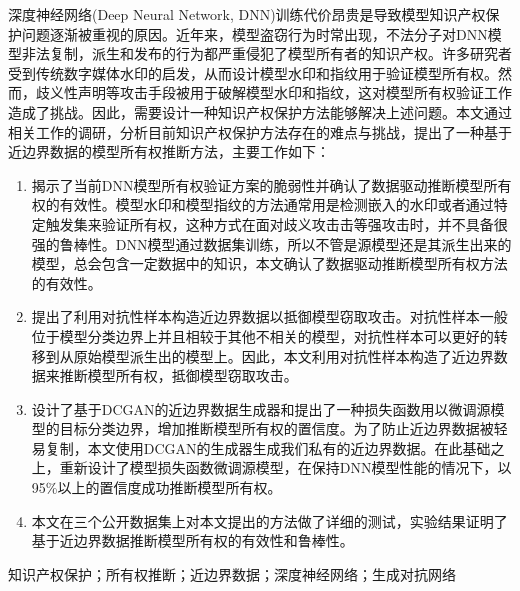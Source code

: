 

\begin{zhaiyao}

深度神经网络(Deep Neural Network, DNN)训练代价昂贵是导致模型知识产权保护问题逐渐被重视的原因。近年来，模型盗窃行为时常出现，不法分子对DNN模型非法复制，派生和发布的行为都严重侵犯了模型所有者的知识产权。许多研究者受到传统数字媒体水印的启发，从而设计模型水印和指纹用于验证模型所有权。然而，歧义性声明等攻击手段被用于破解模型水印和指纹，这对模型所有权验证工作造成了挑战。因此，需要设计一种知识产权保护方法能够解决上述问题。本文通过相关工作的调研，分析目前知识产权保护方法存在的难点与挑战，提出了一种基于近边界数据的模型所有权推断方法，主要工作如下：

\begin{enumerate}
	\renewcommand{\labelenumi}{\theenumi)}
	\item 揭示了当前DNN模型所有权验证方案的脆弱性并确认了数据驱动推断模型所有权的有效性。模型水印和模型指纹的方法通常用是检测嵌入的水印或者通过特定触发集来验证所有权，这种方式在面对歧义攻击击等强攻击时，并不具备很强的鲁棒性。DNN模型通过数据集训练，所以不管是源模型还是其派生出来的模型，总会包含一定数据中的知识，本文确认了数据驱动推断模型所有权方法的有效性。
	\item 提出了利用对抗性样本构造近边界数据以抵御模型窃取攻击。对抗性样本一般位于模型分类边界上并且相较于其他不相关的模型，对抗性样本可以更好的转移到从原始模型派生出的模型上。因此，本文利用对抗性样本构造了近边界数据来推断模型所有权，抵御模型窃取攻击。
	\item 设计了基于DCGAN的近边界数据生成器和提出了一种损失函数用以微调源模型的目标分类边界，增加推断模型所有权的置信度。为了防止近边界数据被轻易复制，本文使用DCGAN的生成器生成我们私有的近边界数据。在此基础之上，重新设计了模型损失函数微调源模型，在保持DNN模型性能的情况下，以95\%以上的置信度成功推断模型所有权。
	\item 本文在三个公开数据集上对本文提出的方法做了详细的测试，实验结果证明了基于近边界数据推断模型所有权的有效性和鲁棒性。
\end{enumerate}

\end{zhaiyao}



\begin{guanjianci}
知识产权保护；所有权推断；近边界数据；深度神经网络；生成对抗网络
\end{guanjianci}



